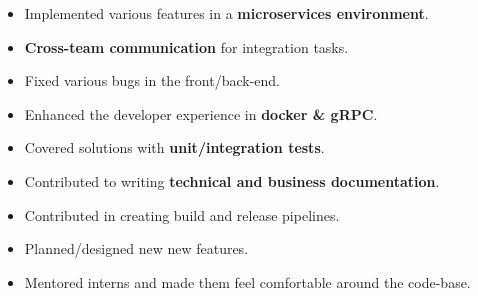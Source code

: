 \documentclass[10pt,a4paper,ragged2e]{altacv}
\begin{document}

\personalinfo{%
	
}

\begin{fullwidth}
	\makecvheader
\end{fullwidth}





\begin{itemize}
	\item Implemented various features in a \textbf{microservices environment}.
	\item \textbf{Cross-team communication} for integration tasks.
	\item Fixed various bugs in the front/back-end.
	\item Enhanced the developer experience in \textbf{docker \& gRPC}.
	\item Covered solutions with \textbf{unit/integration tests}.
	\item Contributed to writing \textbf{technical and business documentation}.
	\item Contributed in creating build and release pipelines.
	\item Planned/designed new new features.
	\item Mentored interns and made them feel comfortable around the code-base.
\end{itemize}

   

    

 

\divider

\end{document}
